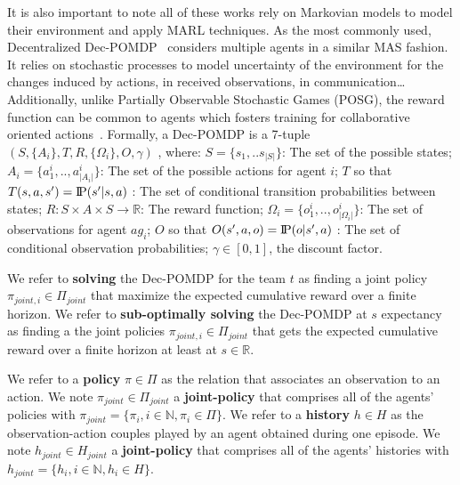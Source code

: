 \documentclass[runningheads]{llncs}
\newcommand{\probP}{\text{I\kern-0.15em P}}
\newcounter{relation}
\begin{document}
It is also important to note all of these works rely on Markovian models to model their environment and apply MARL techniques. As the most commonly used, Decentralized Dec-POMDP~\cite{Oliehoek2016} considers multiple agents in a similar MAS fashion. It relies on stochastic processes to model uncertainty of the environment for the changes induced by actions, in received observations, in communication\dots Additionally, unlike Partially Observable Stochastic Games (POSG), the reward function can be common to agents which fosters training for collaborative oriented actions~\cite{Beynier2013}. Formally, a Dec-POMDP is a 7-tuple $(S,\{A_i\},T,R,\{\Omega_i\},O,\gamma)$ , where: $S = \{s_1, ..s_{|S|}\}$: The set of the possible states; $A_{i} = \{a_{1}^{i},..,a_{|A_{i}|}^{i}\}$: The set of the possible actions for agent $i$; $T$ so that $T(s,a,s') = \probP{(s'|s,a)}$ : The set of conditional transition probabilities between states; $R: S \times A \times S \rightarrow \mathbb{R}$: The reward function; $\Omega_{i} = \{o_{1}^{i},..,o_{|\Omega_{i}|}^{i}\}$: The set of observations for agent $ag_i$; $O$ so that $O(s',a,o) = \probP{(o|s',a)}$ : The set of conditional observation probabilities; $\gamma \in [0,1]$, the discount factor.

We refer to \textbf{solving} the Dec-POMDP for the team $t$ as finding a joint policy $\pi_{joint,i} \in \Pi_{joint}$ that maximize the expected cumulative reward over a finite horizon.
We refer to \textbf{sub-optimally solving} the Dec-POMDP at $s$ expectancy as finding a the joint policies $\pi_{joint,i} \in \Pi_{joint}$ that gets the expected cumulative reward over a finite horizon at least at $s \in \mathbb{R}$.

We refer to a \textbf{policy} $\pi \in \Pi$ as the relation that associates an observation to an action. We note $\pi_{joint} \in \Pi_{joint}$ a \textbf{joint-policy} that comprises all of the agents' policies with $\pi_{joint} = \{\pi_i, i \in \mathbb{N}, \pi_i \in \Pi\}$.
We refer to a \textbf{history} $h \in H$ as the observation-action couples played by an agent obtained during one episode. We note $h_{joint} \in H_{joint}$ a \textbf{joint-policy} that comprises all of the agents' histories with $h_{joint} = \{h_i, i \in \mathbb{N}, h_i \in H\}$.

\end{document}
